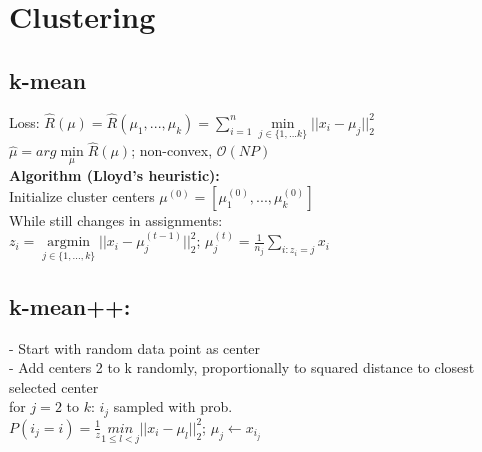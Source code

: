 \section*{Clustering}
\subsection*{k-mean}
Loss: $\hat{R}(\mu) = \hat{R}(\mu_1,...,\mu_k) = \sum_{i=1}^n \underset{j\in\{1,...k\}}{\operatorname{min}}||x_i-\mu_j||_2^2$\\
$\hat{\mu} = arg \underset{\mu}{\operatorname{min}}\hat{R}(\mu)$; non-convex, $\mathcal{O}(NP)$\\
\textbf{Algorithm (Lloyd's heuristic):}\\
Initialize cluster centers $\mu^{(0)} = [\mu_1^{(0)},...,\mu_k^{(0)}]$\\
While still changes in assignments:\\
$z_i = \underset{j\in\{1,...,k\}}{\operatorname{argmin}}||x_i - \mu_j^{(t-1)}||_2^2$; $\mu_j^{(t)} = \frac{1}{n_j}\sum_{i:z_i=j}x_i$\\

\subsection*{k-mean++:}
- Start with random data point as center\\
- Add centers 2 to k randomly, proportionally to squared distance to closest selected center\\
for $j=2$ to $k$:
$i_j$ sampled with prob.\\
$P(i_j=i) = \frac{1}{z} \underset{1\leq l<j}{min}||x_i-\mu_l||_2^2$; $\mu_j \leftarrow x_{i_j}$